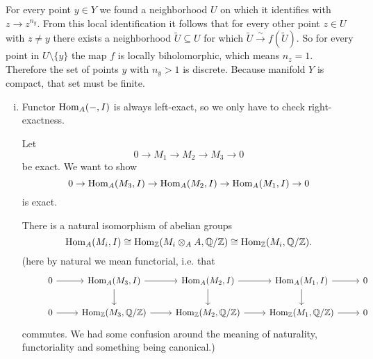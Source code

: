 \begin{exercise}{3}
\begin{enumerate}[i)]
{                For every point $y \in Y$ we found a neighborhood $U$ on which
                it identifies with $z \to z^{n_y}$.
                From this local identification it follows that for every other
                point $z \in U$ with $z \not= y$ there exists a neighborhood
                $\tilde{U} \subseteq U$ for which $\tilde{U} \xrightarrow{\sim}
                f(\tilde{U})$.
                So for every point in $U \setminus \{y\}$ the map $f$ is locally
                biholomorphic, which means $n_z = 1$.
                Therefore the set of points $y$ with $n_y > 1$ is discrete.
                Because manifold $Y$ is compact, that set must be finite.
            }
    \end{enumerate}
\end{exercise}

\begin{exercise}{4}
    \begin{enumerate}[i)]
        \item{
                Functor $\operatorname{Hom}_A(-, I)$ is always left-exact, so we only have to
                check right-exactness.

                Let
                \begin{equation*}
                    0 \to M_1 \to M_2 \to M_3 \to 0
                \end{equation*}
                be exact.
                We want to show
                \begin{equation*}
                    0 \to \operatorname{Hom}_A(M_3, I) \to \operatorname{Hom}_A(M_2, I) \to \operatorname{Hom}_A(M_1, I)
                    \to 0
                \end{equation*}
                is exact.

                There is a natural isomorphism of abelian groups
                \begin{equation*}
                    \operatorname{Hom}_A(M_i, I) \cong \operatorname{Hom}_{\mathbb{Z}}(M_i \otimes_A A, \mathbb{Q} / \mathbb{Z}) \cong
                    \operatorname{Hom}_{\mathbb{Z}}(M_i, \mathbb{Q} / \mathbb{Z}).
                \end{equation*}
                (here by natural we mean functorial, i.e. that
                \begin{equation*}
                \begin{tikzcd}
                    & 0 \arrow{r} & \Hom_A(M_3, I) \arrow{d} \arrow{r} &
                    \Hom_A(M_2, I) \arrow{d} \arrow{r} & \Hom_A(M_1, I)
                    \arrow{d} \arrow{r} & 0 \\
                    & 0 \arrow{r} & \Hom_\Z(M_3, \Q / \Z) \arrow{r} &
                    \Hom_\Z(M_2, \Q / \Z) \arrow{r} & \Hom_\Z(M_1, \Q / \Z)
                    \arrow{r} & 0
                \end{tikzcd}
                \end{equation*}
                commutes. We had some confusion around the meaning of
                naturality, functoriality and something being canonical.)

}
\end{enumerate}
\end{exercise}
